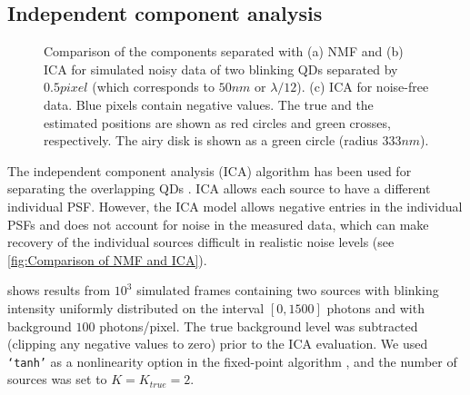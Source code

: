 
\subsection{Independent component analysis\label{sub:ICA}}
\begin{figure}[!htb] %
	\caption{Comparison of the components separated with (a) NMF and (b) ICA for	simulated noisy data of two blinking QDs separated by $0.5 \unit{pixel}$ (which corresponds to $50\unit{nm}$ or $\lambda/12$). (c) ICA for noise-free data.  Blue pixels contain negative values. The true and the estimated positions are shown as red circles and green crosses, respectively. The airy disk is shown as a green circle (radius $333\unit{nm}$).}
	\label{fig:Comparison of NMF and ICA}
\end{figure}

The independent component analysis (ICA) algorithm \cite{Hyvarinen2000} has been used for separating the overlapping QDs \cite{Lidke2005,Lidke2007}. ICA allows each source to have a different individual PSF.  However, the ICA model allows negative entries in the individual PSFs and does not account for noise in the measured data, which can make recovery of the individual sources difficult in realistic noise levels (see \autoref{fig:Comparison of NMF and ICA}). 

\bbb{} shows results from $10^3$ simulated frames containing two sources with blinking intensity uniformly distributed on the interval $[0, 1500]$ photons and with background $100$ photons/pixel. The true background level was subtracted (clipping any negative values to zero) prior to the ICA evaluation. We used {\tt `tanh'} as a nonlinearity option in the fixed-point algorithm \cite{Hyvarinen2000}, and the number of sources was set to $K=K_{true}=2$. 


